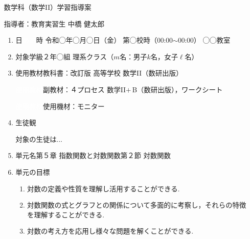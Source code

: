 \documentclass[a4paper,onecolumn,dvipdfmx]{jsarticle}
\theoremstyle{mydefinition}
\newtheorem[topline=true,rightline=true,bottomline=true,linecolor=cyan,linewidth=2pt,shadow=true,shadowcolor=cyan!70!white,shadowsize=5pt]{dfn}{定義}
\newtheorem[topline=true,rightline=true,bottomline=true,linecolor=magenta,linewidth=2pt,shadow=true,shadowcolor=magenta!70!white,shadowsize=5pt]{thm}[dfn]{定理}
\newtheorem[topline=true,rightline=true,bottomline=true]{prop}[dfn]{命題}
\newtheorem[topline=true,rightline=true,bottomline=true]{lem}[dfn]{補題}
\newtheorem[topline=true,rightline=true,bottomline=true]{cor}{系}
\newtheorem[topline=true,rightline=true,bottomline=true,linewidth=2pt]{fact}{事実}
\newtheorem[topline=true,rightline=true,bottomline=true]{Exam}{応用例題}
\newtheorem[bottomline=true]{ex}{例}
\newtheorem[rightline=true,linewidth=2pt]{prob}{問題}
\newtheorem[topline=true,rightline=true,bottomline=true]{prc}{練習}
\begin{document}
	\begin{center}
		{\large 数学科（数学I\!I）学習指導案}
	\end{center}
	
	\begin{flushright}
		指導者：教育実習生 中橋 健太郎
	\end{flushright}
	
	
	\begin{enumerate}
		\item 日\textcolor{white}{ああ}時 \qquad 令和◯年◯月◯日（金） 第◯校時（00:00$\sim$00:00） ◯◯教室\\
		
		\item 対象学級\qquad ２年◯組 理系クラス（$m$名：男子$k$名，女子$\ell$名）\\
		
		\item 使用教材\qquad 教科書：改訂版 高等学校 数学I\!I（数研出版）
		
		\textcolor{white}{使用教材\qquad}副教材：４プロセス 数学I\!I$+$\,B（数研出版），ワークシート
		
		\textcolor{white}{使用教材\qquad}使用機材：モニター\\
		
		\item 生\hspace{.5zw}徒\hspace{.5zw}観
		
		\quad 対象の生徒は...\\
		
		\item 単\hspace{.5zw}元\hspace{.5zw}名\qquad 第５章 指数関数と対数関数\qquad 第２節 対数関数\\
		
		\item 単元の目標
		
		\begin{enumerate}
			\item 対数の定義や性質を理解し活用することができる.
			
			\item 対数関数の式とグラフとの関係について多面的に考察し，それらの特徴を理解することができる.
			
			\item 対数の考え方を応用し様々な問題を解くことができる.\\
		\end{enumerate}
		

\end{enumerate}
\end{document}
